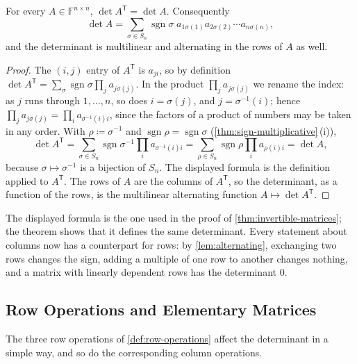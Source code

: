 \begin{theorem}
\label{thm:det-transpose}
For every $A\in\mathbb F^{n\times n}$, $\det A^{\mathsf T}=\det A$. Consequently
\[
\det A=\sum_{\sigma\in S_n}\operatorname{sgn}\sigma\;a_{1\sigma(1)}a_{2\sigma(2)}\cdots a_{n\sigma(n)},
\]
and the determinant is multilinear and alternating in the rows of $A$ as well.
\end{theorem}

\begin{proof}
The $(i,j)$ entry of $A^{\mathsf T}$ is $a_{ji}$, so by definition $\det A^{\mathsf T}=\sum_\sigma\operatorname{sgn}\sigma\prod_ja_{j\sigma(j)}$. In the product $\prod_ja_{j\sigma(j)}$ we rename the index: as $j$ runs through $1,\ldots,n$, so does $i=\sigma(j)$, and $j=\sigma^{-1}(i)$; hence $\prod_ja_{j\sigma(j)}=\prod_ia_{\sigma^{-1}(i)i}$, since the factors of a product of numbers may be taken in any order. With $\rho\coloneqq\sigma^{-1}$ and $\operatorname{sgn}\rho=\operatorname{sgn}\sigma$ (\cref{thm:sign-multiplicative}\,(i)),
\[
\det A^{\mathsf T}=\sum_{\sigma\in S_n}\operatorname{sgn}\sigma^{-1}\prod_ia_{\sigma^{-1}(i)i}=\sum_{\rho\in S_n}\operatorname{sgn}\rho\prod_ia_{\rho(i)i}=\det A,
\]
because $\sigma\mapsto\sigma^{-1}$ is a bijection of $S_n$. The displayed formula is the definition applied to $A^{\mathsf T}$. The rows of $A$ are the columns of $A^{\mathsf T}$, so the determinant, as a function of the rows, is the multilinear alternating function $A\mapsto\det A^{\mathsf T}$.
\end{proof}

The displayed formula is the one used in the proof of \cref{thm:invertible-matrices}; the theorem shows that it defines the same determinant. Every statement about columns now has a counterpart for rows: by \cref{lem:alternating}, exchanging two rows changes the sign, adding a multiple of one row to another changes nothing, and a matrix with linearly dependent rows has the determinant $0$.

\subsection{Row Operations and Elementary Matrices}

The three row operations of \cref{def:row-operations} affect the determinant in a simple way, and so do the corresponding column operations.

